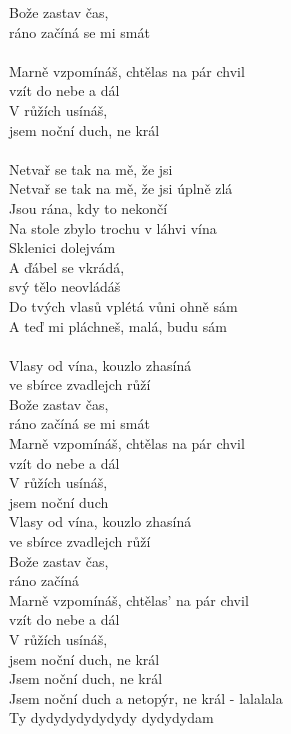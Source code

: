 \begin{multicols}{2}
Bože zastav čas,\\
ráno začíná se mi smát\\
\columnbreak \\
Marně vzpomínáš, chtělas na pár chvil \\
vzít do nebe a dál\\
V růžích usínáš,\\
jsem noční duch, ne král\\
\\
Netvař se tak na mě, že jsi\\
Netvař se tak na mě, že jsi úplně zlá\\
Jsou rána, kdy to nekončí\\
Na stole zbylo trochu v láhvi vína\\
Sklenici dolejvám\\
A ďábel se vkrádá,\\
svý tělo neovládáš\\
Do tvých vlasů vplétá vůni ohně sám\\
A teď mi pláchneš, malá, budu sám\\
\\
Vlasy od vína, kouzlo zhasíná\\
ve sbírce zvadlejch růží\\
Bože zastav čas, \\
ráno začíná se mi smát\\
Marně vzpomínáš, chtělas na pár chvil \\
vzít do nebe a dál\\
V růžích usínáš, \\
jsem noční duch\\
Vlasy od vína, kouzlo zhasíná\\
ve sbírce zvadlejch růží\\
Bože zastav čas, \\
ráno začíná\\
Marně vzpomínáš, chtělas' na pár chvil \\
vzít do nebe a dál\\
V růžích usínáš,\\
jsem noční duch, ne král\\
Jsem noční duch, ne král\\
Jsem noční duch a netopýr, ne král - lalalala\\
Ty dydydydydydydy dydydydam
\end{multicols}